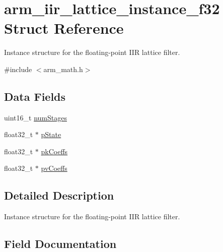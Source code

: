 \hypertarget{structarm__iir__lattice__instance__f32}{}\section{arm\+\_\+iir\+\_\+lattice\+\_\+instance\+\_\+f32 Struct Reference}
\label{structarm__iir__lattice__instance__f32}


Instance structure for the floating-\/point I\+IR lattice filter.  




{\ttfamily \#include $<$arm\+\_\+math.\+h$>$}

\subsection*{Data Fields}
\begin{DoxyCompactItemize}
\item 
uint16\+\_\+t \mbox{\hyperlink{structarm__iir__lattice__instance__f32_a4cceb90547b3e585d4c7aabaa8057212}{num\+Stages}}
\item 
float32\+\_\+t $\ast$ \mbox{\hyperlink{structarm__iir__lattice__instance__f32_a335c87e6fdc4b96601d95a5de8b9c463}{p\+State}}
\item 
float32\+\_\+t $\ast$ \mbox{\hyperlink{structarm__iir__lattice__instance__f32_a994889c5c4a866c50a0ee63326378816}{pk\+Coeffs}}
\item 
float32\+\_\+t $\ast$ \mbox{\hyperlink{structarm__iir__lattice__instance__f32_a0f8815744fade9c580d44277ff802308}{pv\+Coeffs}}
\end{DoxyCompactItemize}


\subsection{Detailed Description}
Instance structure for the floating-\/point I\+IR lattice filter. 

\subsection{Field Documentation}
\mbox{\label{structarm__iir__lattice__instance__f32_a4cceb90547b3e585d4c7aabaa8057212}} 
